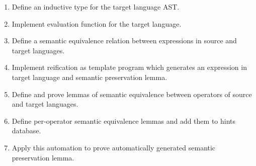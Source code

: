 \documentclass[sigplan]{acmart}\settopmatter{printfolios=true,printccs=false,printacmref=false}
\begin{document}
\begin{enumerate}
\item Define an inductive type for the target language AST.
\item Implement evaluation function for the target language.
\item Define a semantic equivalence relation between expressions in
  source and target languages.
\item Implement reification as template program which generates an
  expression in target language and semantic preservation lemma.
\item Define and prove lemmas of semantic equivalence between
  operators of source and target languages.
\item Define per-operator semantic equivalence lemmas and add them to
  hints database.
\item Apply this automation to prove automatically generated semantic
  preservation lemma.  
\end{enumerate}



\nocite{*}

\end{document}
